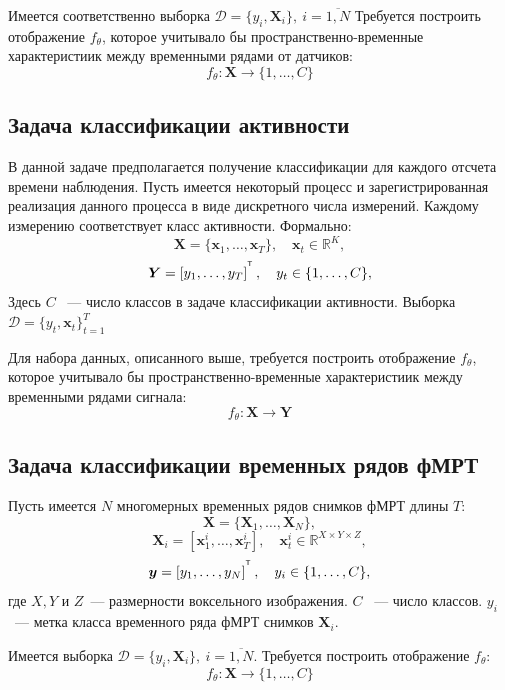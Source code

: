 \documentclass[a4paper, 12pt]{extarticle}
\begin{document}
Имеется соответственно выборка $\mathcal{D} = \{y_i, \bm{X}_i\},~  i = \overline{1,N}$
Требуется построить отображение $f_\theta$, которое учитывало 
бы пространственно-временные характеристиик между временными рядами от датчиков:
$$f_\theta: \bm{X} \rightarrow \{1,\dots, C\}$$ 
\subsection{Задача классификации активности}
В данной задаче предполагается получение классификации для каждого отсчета 
времени наблюдения.
Пусть имеется некоторый процесс и зарегистрированная реализация данного 
процесса в виде дискретного числа измерений. Каждому измерению соответствует
класс активности. Формально:
$$\bm{X} = \{\bm{x}_1,\dots, \bm{x}_{T}\}, \quad \bm{x}_t \in \mathbb{R}^K,$$
$$\bm{Y} = \left[y_1, \dots, y_{T}\right]^{^{\mathsf{T}}},\quad y_t \in \{1,\dots, C\},$$
Здесь $C$ ~--- число классов в задаче классификации активности. 
Выборка $\mathcal{D} = \{y_t, \bm{x}_t\}_{t=1}^T$

Для набора данных, описанного выше, требуется построить отображение $f_\theta$, которое учитывало 
бы пространственно-временные характеристиик между временными рядами сигнала:
$$f_\theta: \bm{X} \rightarrow \bm{Y}$$ 

\subsection{Задача классификации временных рядов фМРТ}
Пусть имеется $N$ многомерных временных рядов снимков фМРТ длины $T$:
\begin{equation*} 
	\bm{X} = \{\bm{X}_1,\dots, \bm{X}_{N}\},
\end{equation*}
\begin{equation*}
	\bm{X}_i = [\bm{x}_{1}^i, \ldots, \bm{x}_{T}^i], \quad
	\bm{x}_{t}^i \in \mathbb{R}^{X \times Y \times Z},
\end{equation*}
$$\bm{y} = \left[y_1, \dots, y_{N}\right]^{^{\mathsf{T}}},\quad y_i \in \{1,\dots, C\},$$
где $X, Y$ и $Z$~--- размерности воксельного изображения. $C$ ~--- число классов.  
$y_i$~--- метка класса временного ряда фМРТ снимков $\bm{X}_i$. 

Имеется выборка $\mathcal{D} = \{y_i, \bm{X}_i\},~ i = \overline{1,N}$.
Требуется построить отображение $f_\theta$:
$$f_\theta: \bm{X} \rightarrow \{1,\dots, C\}$$  
\end{document}
